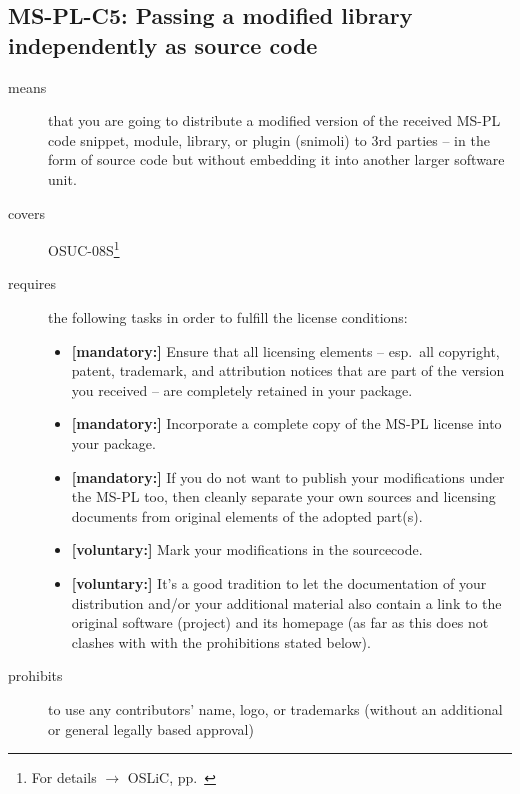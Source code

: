 \subsection{MS-PL-C5: Passing a modified library independently as source code}
\label{OSUC-08S-MS-PL}
\begin{description}
\item[means] that you are going to distribute a modified version of the received
MS-PL code snippet, module, library, or plugin (snimoli) to 3rd parties -- in
the form of source code but without embedding it into another larger software
unit.
\item[covers] OSUC-08S\footnote{For details $\rightarrow$ OSLiC, pp.\
\pageref{OSUC-08S-DEF}}
\item[requires] the following tasks in order to fulfill the license conditions:

\begin{itemize}
  \item \textbf{[mandatory:]} Ensure that all licensing elements -- esp.\ all
  copyright, patent, trademark, and attribution notices that are part of the
  version you received -- are completely retained in your package.
 
  \item \textbf{[mandatory:]} Incorporate a complete copy of the MS-PL license
  into your package.
  
  \item \textbf{[mandatory:]} If you do not want to publish your modifications
  under the MS-PL too, then cleanly separate your own sources and licensing
  documents from original elements of the adopted part(s).
  
  \item \textbf{[voluntary:]} Mark your modifications in the sourcecode.
  
  \item \textbf{[voluntary:]} It's a good tradition to let the documentation of
  your distribution and/or your additional material also contain a link to the
  original software (project) and its homepage (as far as this does not clashes
  with with the prohibitions stated below).
  
\end{itemize}

\item[prohibits] to use any contributors' name, logo, or trademarks (without an
additional or general legally based approval)

\end{description}

